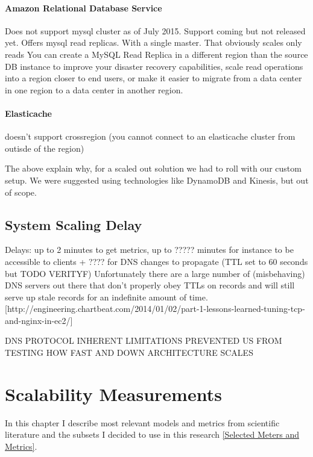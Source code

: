 \documentclass{uvamscse}
\begin{document}
\subsubsection{Amazon Relational Database Service}
Does not support mysql cluster as of July 2015. Support coming but not released yet.
Offers mysql read replicas. With a single master. That obviously scales only reads
You can create a MySQL Read Replica in a different region than the source DB instance to improve your disaster recovery capabilities, scale read operations into a region closer to end users, or make it easier to migrate from a data center in one region to a data center in another region.

\subsubsection{Elasticache}
doesn't support crossregion (you cannot connect to an elasticache cluster from outisde of the region)

The above explain why, for a scaled out solution we had to roll with our custom setup. We were suggested using technologies like DynamoDB and Kinesis, but out of scope.

\section{System Scaling Delay}
Delays: up to 2 minutes to get metrics, up to ????? minutes for instance to be accessible to clients + ???? for DNS changes to propagate (TTL set to 60 seconds but TODO VERITYF)
Unfortunately there are a large number of (misbehaving) DNS servers out there that don’t properly obey TTLs on records and will still serve up stale records for an indefinite amount of time. [http://engineering.chartbeat.com/2014/01/02/part-1-lessons-learned-tuning-tcp-and-nginx-in-ec2/]

DNS PROTOCOL INHERENT LIMITATIONS PREVENTED US FROM TESTING HOW FAST AND DOWN ARCHITECTURE SCALES


\chapter{Scalability Measurements} \label{Scalability Measurements}
In this chapter I describe most relevant models and metrics from scientific literature and the subsets I decided to use in this research \ref{Selected Meters and Metrics}.
\end{document}
